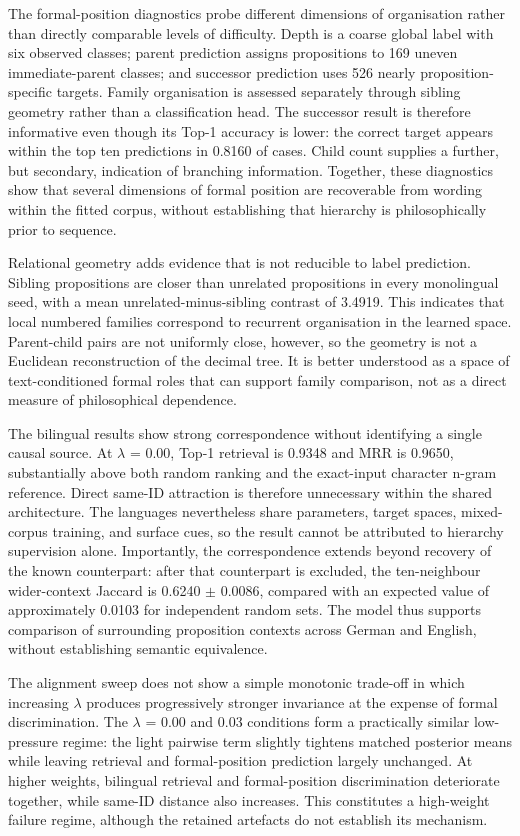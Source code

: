 \documentclass[webpdf,modern,medium,namedate]{oup-authoring-template}
\begin{document}
The formal-position diagnostics probe different dimensions of organisation rather than directly comparable levels of difficulty. Depth is a coarse global label with six observed classes; parent prediction assigns propositions to 169 uneven immediate-parent classes; and successor prediction uses 526 nearly proposition-specific targets. Family organisation is assessed separately through sibling geometry rather than a classification head. The successor result is therefore informative even though its Top-1 accuracy is lower: the correct target appears within the top ten predictions in 0.8160 of cases. Child count supplies a further, but secondary, indication of branching information. Together, these diagnostics show that several dimensions of formal position are recoverable from wording within the fitted corpus, without establishing that hierarchy is philosophically prior to sequence.

Relational geometry adds evidence that is not reducible to label prediction. Sibling propositions are closer than unrelated propositions in every monolingual seed, with a mean unrelated-minus-sibling contrast of 3.4919. This indicates that local numbered families correspond to recurrent organisation in the learned space. Parent-child pairs are not uniformly close, however, so the geometry is not a Euclidean reconstruction of the decimal tree. It is better understood as a space of text-conditioned formal roles that can support family comparison, not as a direct measure of philosophical dependence.

The bilingual results show strong correspondence without identifying a single causal source. At $\lambda$ = 0.00, Top-1 retrieval is 0.9348 and MRR is 0.9650, substantially above both random ranking and the exact-input character n-gram reference. Direct same-ID attraction is therefore unnecessary within the shared architecture. The languages nevertheless share parameters, target spaces, mixed-corpus training, and surface cues, so the result cannot be attributed to hierarchy supervision alone. Importantly, the correspondence extends beyond recovery of the known counterpart: after that counterpart is excluded, the ten-neighbour wider-context Jaccard is 0.6240 $\pm$ 0.0086, compared with an expected value of approximately 0.0103 for independent random sets. The model thus supports comparison of surrounding proposition contexts across German and English, without establishing semantic equivalence.

The alignment sweep does not show a simple monotonic trade-off in which increasing $\lambda$ produces progressively stronger invariance at the expense of formal discrimination. The $\lambda$ = 0.00 and 0.03 conditions form a practically similar low-pressure regime: the light pairwise term slightly tightens matched posterior means while leaving retrieval and formal-position prediction largely unchanged. At higher weights, bilingual retrieval and formal-position discrimination deteriorate together, while same-ID distance also increases. This constitutes a high-weight failure regime, although the retained artefacts do not establish its mechanism.
\end{document}
